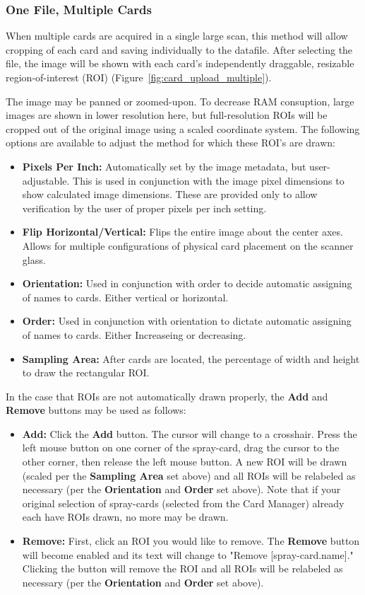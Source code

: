 \documentclass[10pt,letterpaper,titlepage]{article}
\begin{document}
    \subsubsection{One File, Multiple Cards}
    When multiple cards are acquired in a single large scan, this method will allow cropping of each card and saving individually to the datafile. After selecting the file, the image will be shown with each card's independently draggable, resizable region-of-interest (ROI) (Figure~\ref{fig:card_upload_multiple}).\par 
    The image may be panned or zoomed-upon. To decrease RAM consuption, large images are shown in lower resolution here, but full-resolution ROIs will be cropped out of the original image using a scaled coordinate system. The following options are available to adjust the method for which these ROI's are drawn:
    \begin{itemize}
        \item \textbf{Pixels Per Inch:} Automatically set by the image metadata, but user-adjustable. This is used in conjunction with the image pixel dimensions to show calculated image dimensions. These are provided only to allow verification by the user of proper pixels per inch setting.
        \item \textbf{Flip Horizontal/Vertical:} Flips the entire image about the center axes. Allows for multiple configurations of physical card placement on the scanner glass. 
        \item \textbf{Orientation:} Used in conjunction with order to decide automatic assigning of names to cards. Either vertical or horizontal.
        \item \textbf{Order:} Used in conjunction with orientation to dictate automatic assigning of names to cards. Either Increaseing or decreasing.
        \item \textbf{Sampling Area:} After cards are located, the percentage of width and height to draw the rectangular ROI.
    \end{itemize}
    In the case that ROIs are not automatically drawn properly, the \textbf{Add} and \textbf{Remove} buttons may be used as follows:
    \begin{itemize} 
        \item \textbf{Add:} Click the \textbf{Add} button. The cursor will change to a crosshair. Press the left mouse button on one corner of the spray-card, drag the cursor to the other corner, then release the left mouse button. A new ROI will be drawn (scaled per the \textbf{Sampling Area} set above) and all ROIs will be relabeled as necessary (per the \textbf{Orientation} and \textbf{Order} set above). Note that if your original selection of spray-cards (selected from the Card Manager) already each have ROIs drawn, no more may be drawn.
        \item \textbf{Remove:} First, click an ROI you would like to remove. The \textbf{Remove} button will become enabled and its text will change to "Remove [spray-card.name]." Clicking the button will remove the ROI and all ROIs will be relabeled as necessary (per the \textbf{Orientation} and \textbf{Order} set above).
    \end{itemize}
\end{document}
